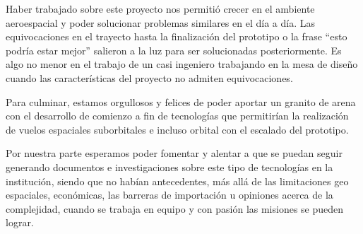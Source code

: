 
\medskip

Haber trabajado sobre este proyecto nos permitió crecer en el ambiente aeroespacial y poder solucionar problemas similares en el día a día. Las equivocaciones en el trayecto hasta la finalización del prototipo o la frase “esto podría estar mejor” salieron a la luz para ser solucionadas posteriormente. Es algo no menor en el trabajo de un casi ingeniero trabajando en la mesa de diseño cuando las características del proyecto no admiten equivocaciones.

Para culminar, estamos orgullosos y felices de poder aportar un granito de arena con el desarrollo de comienzo a fin de tecnologías que permitirían la realización de vuelos espaciales suborbitales e incluso orbital con el escalado del prototipo.

Por nuestra parte esperamos poder fomentar y alentar a que se puedan seguir generando documentos e investigaciones sobre este tipo de tecnologías en la institución, siendo que no habían antecedentes, más allá de las limitaciones geo espaciales, económicas, las barreras de importación u opiniones acerca de la complejidad, cuando se trabaja en equipo y con pasión las misiones se pueden lograr.
